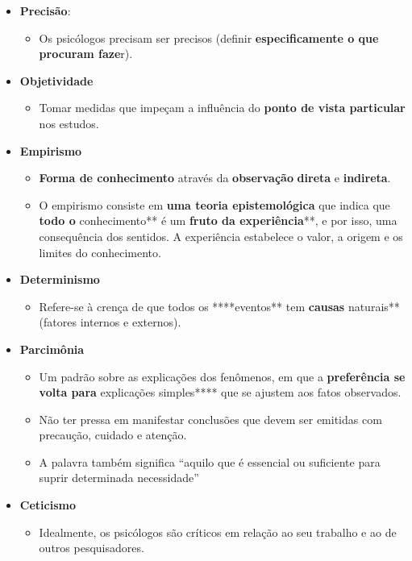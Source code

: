 \documentclass[
]{book}
\providecommand{\tightlist}{%
  \setlength{\itemsep}{0pt}\setlength{\parskip}{0pt}}
\begin{document}
\begin{itemize}
\tightlist
\item
  \textbf{Precisão}:

  \begin{itemize}
  \tightlist
  \item
    Os psicólogos precisam ser precisos (definir \textbf{especificamente o que procuram faze}r).
  \end{itemize}
\item
  \textbf{Objetividade}

  \begin{itemize}
  \tightlist
  \item
    Tomar medidas que impeçam a influência do \textbf{ponto de vista particular} nos estudos.
  \end{itemize}
\item
  \textbf{Empirismo}

  \begin{itemize}
  \tightlist
  \item
    \textbf{Forma de conhecimento} através da \textbf{observação} \textbf{direta} e \textbf{indireta}.
  \item
    O empirismo consiste em \textbf{uma teoria epistemológica} que indica que \textbf{todo o }conhecimento** é um \textbf{fruto da experiência}**, e por isso, uma consequência dos sentidos. A experiência estabelece o valor, a origem e os limites do conhecimento.
  \end{itemize}
\item
  \textbf{Determinismo}

  \begin{itemize}
  \tightlist
  \item
    Refere-se à crença de que todos os ****eventos** tem \textbf{causas} naturais** (fatores internos e externos).
  \end{itemize}
\item
  \textbf{Parcimônia}

  \begin{itemize}
  \tightlist
  \item
    Um padrão sobre as explicações dos fenômenos, em que a \textbf{preferência se volta para }explicações simples**** que se ajustem aos fatos observados.
  \item
    Não ter pressa em manifestar conclusões que devem ser emitidas com precaução, cuidado e atenção.
  \item
    A palavra também significa ``aquilo que é essencial ou suficiente para suprir determinada necessidade''
  \end{itemize}
\item
  \textbf{Ceticismo}

  \begin{itemize}
  \tightlist
  \item
    Idealmente, os psicólogos são críticos em relação ao seu trabalho e ao de outros pesquisadores.
  \end{itemize}
\end{itemize}
\end{document}
